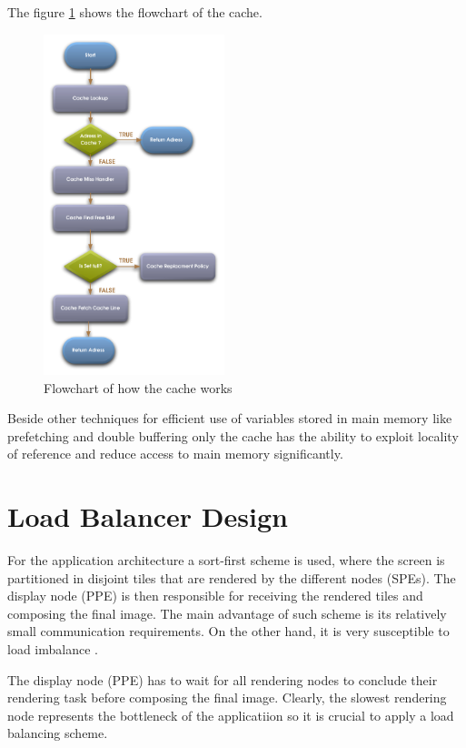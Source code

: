 \documentclass[DIV10, abstracton, openright, footsepline, headsepline, twoside, 9pt,
bigheadings]{scrreprt}
\begin{document}
The figure \ref{fig:cache_design_flowchart} shows the flowchart of the cache.

\begin{figure}[H]
\centering
\includegraphics[width=0.47\textwidth]{diagramme/cache_flowchart}
\caption{Flowchart of how the cache works}
\label{fig:cache_design_flowchart}
\end{figure}


Beside other techniques for efficient use of variables stored in main memory like
prefetching and double buffering only the cache has the ability to exploit
locality of reference and reduce access to main memory significantly.


\section{Load Balancer Design}
\label{sec:design_load_balancer}
For the application architecture a sort-first scheme is used, where the screen is partitioned
in disjoint tiles that are rendered by the different nodes (SPEs). The display node (PPE)
is then responsible for receiving the rendered tiles and composing the final image. The
main advantage of such scheme is its relatively small communication requirements. On the
other hand, it is very susceptible to load imbalance \cite{Molnar94}.

The display node (PPE) has to wait for all rendering nodes to conclude their rendering
task before composing the final image. Clearly, the slowest rendering node represents
the bottleneck of the applicatiion so it is crucial to apply a load balancing scheme.
\end{document}
